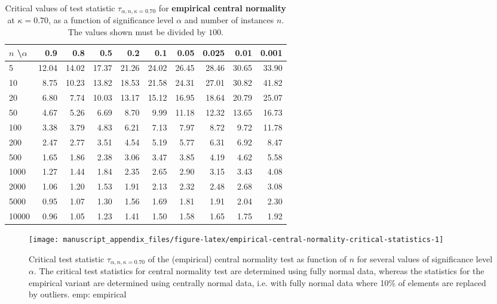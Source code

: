\documentclass[
  a4paper,
]{article}
\begin{document}
\begin{table}
\begin{center}
\caption{Critical values of test statistic $\tau_{\alpha, n, \kappa = 0.70}$ for
\textbf{empirical central normality} at $\kappa = 0.70$, as a function of significance 
level $\alpha$ and number of instances $n$. The values shown must be divided by $100$.}
\label{tab:empirical-central-normality-critical-statistic}
\begin{tabular}{l | r r r r r r r r r}

\toprule
$n$ \textbackslash $\alpha$ & 0.9 & 0.8 & 0.5 & 0.2 & 0.1 & 0.05 & 0.025 & 0.01 & 0.001 \\

\midrule
5     & 12.04 & 14.02 & 17.37 & 21.26 & 24.02 & 26.45 & 28.46 & 30.65 & 33.90 \\
10    &  8.75 & 10.23 & 13.82 & 18.53 & 21.58 & 24.31 & 27.01 & 30.82 & 41.82 \\
20    &  6.80 &  7.74 & 10.03 & 13.17 & 15.12 & 16.95 & 18.64 & 20.79 & 25.07 \\
50    &  4.67 &  5.26 &  6.69 &  8.70 &  9.99 & 11.18 & 12.32 & 13.65 & 16.73 \\
100   &  3.38 &  3.79 &  4.83 &  6.21 &  7.13 &  7.97 &  8.72 &  9.72 & 11.78 \\ 
200   &  2.47 &  2.77 &  3.51 &  4.54 &  5.19 &  5.77 &  6.31 &  6.92 &  8.47 \\
500   &  1.65 &  1.86 &  2.38 &  3.06 &  3.47 &  3.85 &  4.19 &  4.62 &  5.58 \\
1000  &  1.27 &  1.44 &  1.84 &  2.35 &  2.65 &  2.90 &  3.15 &  3.43 &  4.08 \\
2000  &  1.06 &  1.20 &  1.53 &  1.91 &  2.13 &  2.32 &  2.48 &  2.68 &  3.08 \\
5000  &  0.95 &  1.07 &  1.30 &  1.56 &  1.69 &  1.81 &  1.91 &  2.04 &  2.30 \\
10000 &  0.96 &  1.05 &  1.23 &  1.41 &  1.50 &  1.58 &  1.65 &  1.75 &  1.92 \\
\bottomrule
\end{tabular}
\end{center}
\end{table}

\begin{figure}

{\centering \texttt{[image: manuscript\_appendix\_files/figure-latex/empirical-central-normality-critical-statistics-1]} 

}

\caption{Critical test statistic $\tau_{\alpha, n, \kappa = 0.70}$ of the (empirical) central normality test as function of $n$ for several values of significance level $\alpha$. The critical test statistics for central normality test are determined using fully normal data, whereas the statistics for the empirical variant are determined using centrally normal data, i.e. with fully normal data where 10\% of elements are replaced by outliers. emp: empirical}\label{fig:empirical-central-normality-critical-statistics}
\end{figure}
\end{document}
